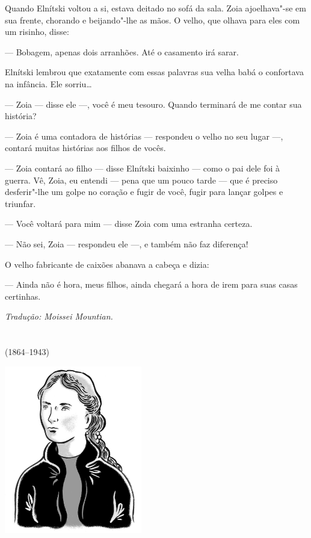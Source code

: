 Quando Elnítski voltou a si, estava deitado no sofá da sala. Zoia
ajoelhava"-se em sua frente, chorando e beijando"-lhe as mãos. O velho,
que olhava para eles com um risinho, disse:

--- Bobagem, apenas dois arranhões. Até o casamento irá sarar.

Elnítski lembrou que exatamente com essas palavras sua velha babá o
confortava na infância. Ele sorriu\ldots{}

--- Zoia --- disse ele ---, você é meu tesouro. Quando terminará de me
contar sua história?

--- Zoia é uma contadora de histórias --- respondeu o velho no seu lugar
---, contará muitas histórias aos filhos de vocês.

--- Zoia contará ao filho --- disse Elnítski baixinho --- como o pai
dele foi à guerra. Vê, Zoia, eu entendi --- pena que um pouco tarde ---
que é preciso desferir"-lhe um golpe no coração e fugir de você, fugir
para lançar golpes e triunfar.

--- Você voltará para mim --- disse Zoia com uma estranha certeza.

--- Não sei, Zoia --- respondeu ele ---, e também não faz diferença!

O velho fabricante de caixões abanava a cabeça e dizia:

--- Ainda não é hora, meus filhos, ainda chegará a hora de irem para
suas casas certinhas.

\medskip

{\footnotesize\hfill\emph{Tradução: Moissei Mountian.}}


\chapter*{}
\label{part9}
\thispagestyle{empty}

\begin{vplace}[1.5]
{\HUGES\hfill{}}

{\LARGE\hfill\textlt(1864–1943)}
\end{vplace}

\pagebreak
\thispagestyle{empty}
\mbox{}
\vfill
\begin{center}
\includegraphics[width=6cm]{./imgs/autor8.jpg}
\end{center}

